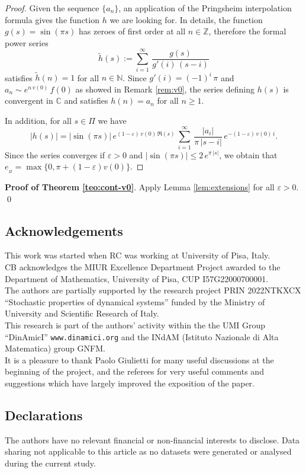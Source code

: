 \documentclass[11pt]{amsart}
\theoremstyle{definition}
\theoremstyle{remark}
\theoremstyle{definition}
\numberwithin{equation}{section}
\newcommand{\Z}{\mathbb Z}
\newcommand{\N}{\mathbb N}
\newcommand{\C}{\mathbb C}
\newcommand{\eps}{\varepsilon}
\begin{document}
\begin{proof}
Given the sequence $\{a_n\}$, an application of the Pringsheim interpolation formula gives the function $h$ we are looking for. In details, the function $g(s)= \sin (\pi s)$ has zeroes of first order at all $n\in \Z$, therefore the formal power series
\[
\tilde h(s):=\sum_{i=1}^\infty\, \frac{g(s)}{g'(i)\, (s-i)}
\]
satisfies $\tilde h(n) =1$ for all $n\in \N$. Since $g'(i) = (-1)^i\, \pi$ and $a_n \sim e^{n\, v(0)}\, f(0)$ as showed in Remark \ref{rem:v0}, the series defining $h(s)$ is convergent in $\C$ and satisfies $h(n) = a_n$ for all $n\ge 1$.

In addition, for all $s\in \Pi$ we have
\[
|h(s)| = |\sin (\pi s)|\, e^{(1-\eps)\, v(0)\, \Re(s)}\, \sum_{i=1}^\infty\, \frac{|a_i|}{\pi\, |s-i|}\, e^{-(1-\eps)\, v(0)\, i}.
\]
Since the series converges if $\eps>0$ and $|\sin (\pi s)| \le 2\, e^{\pi\, |s|}$, we obtain that $e_{_\Pi} = \max\{0, \pi+(1-\eps) v(0)\} $.
\end{proof}

\noindent \textbf{Proof of Theorem \ref{teo:cont-v0}}. Apply Lemma \ref{lem:extensions} for all $\eps>0$. \qed


\subsection*{Acknowledgements} This work was started when RC was working at University of Pisa, Italy.\\ CB acknowledges the MIUR Excellence Department Project awarded to the Department of Mathematics, University of Pisa, CUP I57G22000700001.\\ The authors are partially supported by the research project PRIN 2022NTKXCX ``Stochastic properties of dynamical systems'' funded by the Ministry of University and Scientific Research of Italy.\\ This research is part of the authors' activity within the the UMI Group ``DinAmicI'' \texttt{www.dinamici.org} and the INdAM (Istituto Nazionale di Alta Matematica) group GNFM.\\ It is a pleasure to thank Paolo Giulietti for many useful discussions at the beginning of the project, {and the referees for very useful comments and suggestions which have largely improved the exposition of the paper.}


\subsection*{Declarations}
The authors have no relevant financial or non-financial interests to disclose. Data sharing not applicable to this article as no datasets were generated or analysed during the current study.
\end{document}

